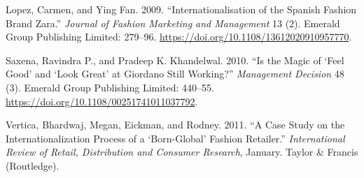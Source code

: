 \documentclass[12pt,a4paper]{article}
\begin{document}
\leavevmode\hypertarget{ref-innovative16}{}%
Lopez, Carmen, and Ying Fan. 2009. ``Internationalisation of the Spanish
Fashion Brand Zara.'' \emph{Journal of Fashion Marketing and Management}
13 (2). Emerald Group Publishing Limited: 279--96.
\url{https://doi.org/10.1108/13612020910957770}.

\leavevmode\hypertarget{ref-innovative15}{}%
Saxena, Ravindra P., and Pradeep K. Khandelwal. 2010. ``Is the Magic of
`Feel Good' and `Look Great' at Giordano Still Working?''
\emph{Management Decision} 48 (3). Emerald Group Publishing Limited:
440--55. \url{https://doi.org/10.1108/00251741011037792}.

\leavevmode\hypertarget{ref-innovative6}{}%
Vertica, Bhardwaj, Megan, Eickman, and Rodney. 2011. ``A Case Study on
the Internationalization Process of a `Born-Global' Fashion Retailer.''
\emph{International Review of Retail, Distribution and Consumer
Research}, January. Taylor \& Francis (Routledge).
\end{document}
